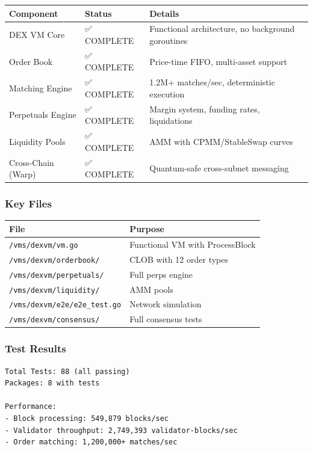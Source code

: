 \documentclass[
]{article}
\newcounter{none} %
\begin{document}
{\def\LTcaptype{none} %
\begin{longtable}[]{@{}lll@{}}
\toprule\noalign{}
Component & Status & Details \\
\midrule\noalign{}
\endhead
\bottomrule\noalign{}
\endlastfoot
DEX VM Core & ✅ COMPLETE & Functional architecture, no background
goroutines \\
Order Book & ✅ COMPLETE & Price-time FIFO, multi-asset support \\
Matching Engine & ✅ COMPLETE & 1.2M+ matches/sec, deterministic
execution \\
Perpetuals Engine & ✅ COMPLETE & Margin system, funding rates,
liquidations \\
Liquidity Pools & ✅ COMPLETE & AMM with CPMM/StableSwap curves \\
Cross-Chain (Warp) & ✅ COMPLETE & Quantum-safe cross-subnet
messaging \\
\end{longtable}
}

\subsubsection{Key Files}\label{key-files}

{\def\LTcaptype{none} %
\begin{longtable}[]{@{}ll@{}}
\toprule\noalign{}
File & Purpose \\
\midrule\noalign{}
\endhead
\bottomrule\noalign{}
\endlastfoot
\texttt{/vms/dexvm/vm.go} & Functional VM with ProcessBlock \\
\texttt{/vms/dexvm/orderbook/} & CLOB with 12 order types \\
\texttt{/vms/dexvm/perpetuals/} & Full perps engine \\
\texttt{/vms/dexvm/liquidity/} & AMM pools \\
\texttt{/vms/dexvm/e2e/e2e\_test.go} & Network simulation \\
\texttt{/vms/dexvm/consensus/} & Full consensus tests \\
\end{longtable}
}

\subsubsection{Test Results}\label{test-results}

\begin{verbatim}
Total Tests: 88 (all passing)
Packages: 8 with tests

Performance:
- Block processing: 549,879 blocks/sec
- Validator throughput: 2,749,393 validator-blocks/sec
- Order matching: 1,200,000+ matches/sec
\end{verbatim}
\end{document}
